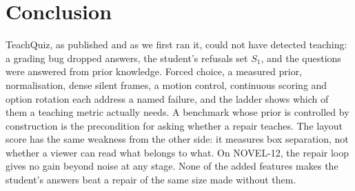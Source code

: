 \section{Conclusion}

TeachQuiz, as published and as we first ran it, could not have detected teaching: a grading bug dropped answers,
the student's refusals set $S_1$, and the questions were answered from prior knowledge. Forced choice, a measured
prior, normalisation, dense silent frames, a motion control, continuous scoring and option rotation each address a
named failure, and the ladder shows which of them a teaching metric actually needs. A benchmark whose prior is
controlled by construction is the precondition for asking whether a repair teaches. The layout score has the same
weakness from the other side: it measures box separation, not whether a viewer can read what belongs to what. On
NOVEL-12, the repair loop gives no gain beyond noise at any stage. None of the added features makes the student's
answers beat a repair of the same size made without them.
